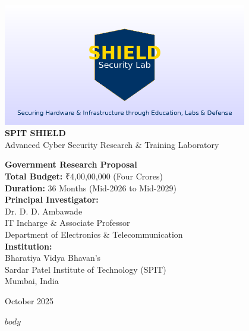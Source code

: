 \documentclass[11pt,a4paper]{article}
\begin{document}
\begin{titlepage}
    \centering
    \vspace*{1cm}
    
    \includegraphics[width=0.8\textwidth]{shield-logo.png}\\[2cm]
    
    {\Huge\bfseries\color{titlecolor}SPIT SHIELD\\[0.5cm]}
    {\LARGE\color{subtitlecolor}Advanced Cyber Security Research \& Training Laboratory\\[2cm]}
    
    \begin{tcolorbox}[colback=spitblue!5,colframe=spitblue,width=0.8\textwidth,arc=3mm]
        \centering
        {\large\textbf{Government Research Proposal}}\\[0.5cm]
        \textbf{Total Budget:} ₹4,00,00,000 (Four Crores)\\
        \textbf{Duration:} 36 Months (Mid-2026 to Mid-2029)\\[0.3cm]
        \textbf{Principal Investigator:}\\
        Dr. D. D. Ambawade\\
        IT Incharge \& Associate Professor\\
        Department of Electronics \& Telecommunication\\[0.3cm]
        \textbf{Institution:}\\
        Bharatiya Vidya Bhavan's\\
        Sardar Patel Institute of Technology (SPIT)\\
        Mumbai, India
    \end{tcolorbox}
    
    \vfill
    {\large October 2025}
\end{titlepage}

\newpage
\tableofcontents
\newpage

$body$
\end{document}

